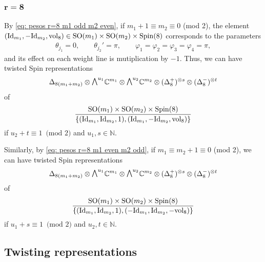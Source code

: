 \documentclass[pdftex]{sigma}
\newcommand{\ext}{\raise1pt\hbox{$\textstyle\bigwedge$}}
\numberwithin{equation}{section}
\begin{document}
\subsubsection[$r=8$]{$\boldsymbol{r=8}$}
By \eqref{eq: pesos r=8 m1 odd m2 even}, if $m_1+1\equiv m_2\equiv 0$ (mod 2), the element $({\rm Id}_{m_1},-{\rm Id}_{m_2},{\rm vol}_8)\in {\rm SO}(m_1)\times {\rm SO}(m_2)\times {\rm Spin}(8)$ corresponds to the parameters
\begin{gather*}
 \theta_{j_1} = 0 , \qquad \theta_{j_2}' = \pi , \qquad \varphi_1 = \varphi_2 = \varphi_3 = \varphi_4 = \pi,
\end{gather*}
and its ef\/fect on each weight line is mutiplication by $-1$. Thus, we can have twisted Spin representations
\begin{gather*}\Delta_{8(m_1+m_2)}\otimes \ext^{u_1} \mathbb{C}^{m_1}\otimes \ext^{u_2} \mathbb{C}^{m_2}\otimes(\Delta_8^+)^{\otimes s}\otimes (\Delta_8^-)^{\otimes t}\end{gather*}
of{\samepage
\begin{gather*}
{{\rm SO}(m_1)\times {\rm SO}(m_2)\times {\rm Spin}(8)\over \{({\rm Id}_{m_1},{\rm Id}_{m_2},1),({\rm Id}_{m_1},-{\rm Id}_{m_2},{\rm vol}_8)\}}\end{gather*} if $u_2+t\equiv 1\,\,\,\mbox{(mod 2)}$ and $u_1,s\in \mathbb{N}$.}

Similarly, by \eqref{eq: pesos r=8 m1 even m2 odd}, if $m_1\equiv m_2+1\equiv 0$ (mod 2), we can have twisted Spin representations
\begin{gather*}\Delta_{8(m_1+m_2)}\otimes \ext^{u_1} \mathbb{C}^{m_1}\otimes \ext^{u_2} \mathbb{C}^{m_2}\otimes(\Delta_8^+)^{\otimes s}\otimes (\Delta_8^-)^{\otimes t} \end{gather*}
of
\begin{gather*}
{{\rm SO}(m_1)\times {\rm SO}(m_2)\times {\rm Spin}(8)\over \{({\rm Id}_{m_1},{\rm Id}_{m_2},1),(-{\rm Id}_{m_1},{\rm Id}_{m_2},-{\rm vol}_8)\}}
\end{gather*} if
$u_1+s\equiv 1\,\,\,\mbox{(mod 2)}$ and $u_2,t\in \mathbb{N}.$

\subsection{Twisting representations}\label{subsec: conditions 2}
\end{document}
